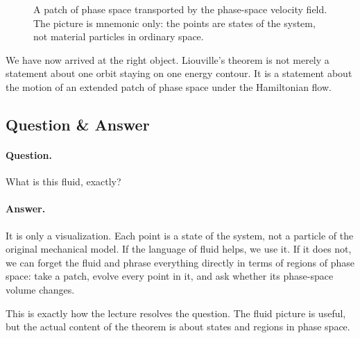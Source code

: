 \begin{figure}[h]
\centering
{}
\caption{A patch of phase space transported by the phase-space velocity field. The picture is mnemonic only: the points are states of the system, not material particles in ordinary space.}
\end{figure}

We have now arrived at the right object. Liouville's theorem is not merely a statement about one orbit staying on one energy contour. It is a statement about the motion of an extended patch of phase space under the Hamiltonian flow.

\subsection{Question \& Answer}

\paragraph{Question.} What is this fluid, exactly?

\paragraph{Answer.} It is only a visualization. Each point is a state of the system, not a particle of the original mechanical model. If the language of fluid helps, we use it. If it does not, we can forget the fluid and phrase everything directly in terms of regions of phase space: take a patch, evolve every point in it, and ask whether its phase-space volume changes.

This is exactly how the lecture resolves the question. The fluid picture is useful, but the actual content of the theorem is about states and regions in phase space.

